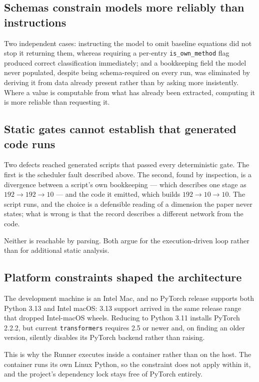 \documentclass[10pt,twocolumn]{article}
\begin{document}
\subsection{Schemas constrain models more reliably than instructions}

Two independent cases: instructing the model to omit baseline equations did not stop it
returning them, whereas requiring a per-entry \texttt{is\_own\_method} flag produced
correct classification immediately; and a bookkeeping field the model never populated,
despite being schema-required on every run, was eliminated by deriving it from data
already present rather than by asking more insistently. Where a value is computable from
what has already been extracted, computing it is more reliable than requesting it.

\subsection{Static gates cannot establish that generated code runs}

Two defects reached generated scripts that passed every deterministic gate. The first is
the scheduler fault described above. The second, found by inspection, is a divergence
between a script's own bookkeeping --- which describes one stage as $192\to192\to10$ ---
and the code it emitted, which builds $192\to10\to10$. The script runs, and the choice is
a defensible reading of a dimension the paper never states; what is wrong is that the
record describes a different network from the code.

Neither is reachable by parsing. Both argue for the execution-driven loop rather than for
additional static analysis.

\subsection{Platform constraints shaped the architecture}

The development machine is an Intel Mac, and no PyTorch release supports both Python 3.13
and Intel macOS: 3.13 support arrived in the same release range that dropped Intel-macOS
wheels. Reducing to Python 3.11 installs PyTorch 2.2.2, but current \texttt{transformers}
requires 2.5 or newer and, on finding an older version, silently disables its PyTorch
backend rather than raising.

This is why the Runner executes inside a container rather than on the host. The container
runs its own Linux Python, so the constraint does not apply within it, and the project's
dependency lock stays free of PyTorch entirely.
\end{document}
